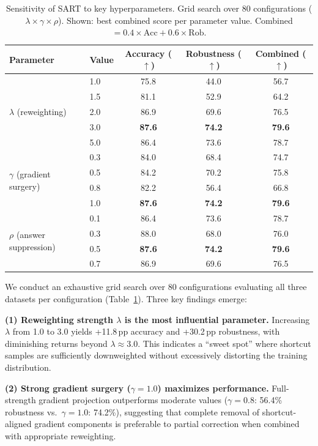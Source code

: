 \begin{table}[t]
\centering
\caption{Sensitivity of SART to key hyperparameters. Grid search over 80 configurations ($\lambda \times \gamma \times \rho$). Shown: best combined score per parameter value. Combined $= 0.4 \times \text{Acc} + 0.6 \times \text{Rob}$.}
\label{tab:sensitivity}
\small
\begin{tabular}{llccc}
\toprule
\textbf{Parameter} & \textbf{Value} & \textbf{Accuracy} ($\uparrow$) & \textbf{Robustness} ($\uparrow$) & \textbf{Combined} ($\uparrow$) \\
\midrule
\multirow{5}{*}{$\lambda$ (reweighting)}
    & 1.0 & 75.8 & 44.0 & 56.7 \\
    & 1.5 & 81.1 & 52.9 & 64.2 \\
    & 2.0 & 86.9 & 69.6 & 76.5 \\
    & 3.0 & \textbf{87.6} & \textbf{74.2} & \textbf{79.6} \\
    & 5.0 & 86.4 & 73.6 & 78.7 \\
\midrule
\multirow{4}{*}{$\gamma$ (gradient surgery)}
    & 0.3 & 84.0 & 68.4 & 74.7 \\
    & 0.5 & 84.2 & 70.2 & 75.8 \\
    & 0.8 & 82.2 & 56.4 & 66.8 \\
    & 1.0 & \textbf{87.6} & \textbf{74.2} & \textbf{79.6} \\
\midrule
\multirow{4}{*}{$\rho$ (answer suppression)}
    & 0.1 & 86.4 & 73.6 & 78.7 \\
    & 0.3 & 88.0 & 68.0 & 76.0 \\
    & 0.5 & \textbf{87.6} & \textbf{74.2} & \textbf{79.6} \\
    & 0.7 & 86.9 & 69.6 & 76.5 \\
\bottomrule
\end{tabular}
\end{table}

We conduct an exhaustive grid search over 80 configurations evaluating all three datasets per configuration (Table~\ref{tab:sensitivity}). Three key findings emerge:

\textbf{(1) Reweighting strength $\lambda$ is the most influential parameter.} Increasing $\lambda$ from 1.0 to 3.0 yields +11.8\,pp accuracy and +30.2\,pp robustness, with diminishing returns beyond $\lambda \approx 3.0$. This indicates a ``sweet spot'' where shortcut samples are sufficiently downweighted without excessively distorting the training distribution.

\textbf{(2) Strong gradient surgery ($\gamma=1.0$) maximizes performance.} Full-strength gradient projection outperforms moderate values ($\gamma=0.8$: 56.4\% robustness vs.\ $\gamma=1.0$: 74.2\%), suggesting that complete removal of shortcut-aligned gradient components is preferable to partial correction when combined with appropriate reweighting.

